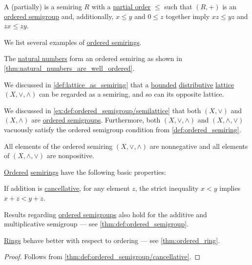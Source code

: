 \begin{definition}\label{def:ordered_semiring}
  A (partially)  is a semiring \( R \) with a \hyperref[def:partially_ordered_set]{partial order} \( \leq \) such that \( (R, +) \) is an \hyperref[def:ordered_semigroup]{ordered semigroup} and, additionally, \( x \leq y \) and \( 0 \leq z \) together imply \( xz \leq yz \) and \( zx \leq zy \).
\end{definition}

\begin{example}\label{ex:def:ordered_semiring}
  We list several examples of \hyperref[def:ordered_semiring]{ordered semirings}.

  \begin{thmenum}
     The \hyperref[def:natural_numbers]{natural numbers} form an ordered semiring as shown in \cref{thm:natural_numbers_are_well_ordered}.

     We discussed in \cref{def:lattice_as_semiring} that a \hyperref[def:extremal_points/bounds]{bounded} \hyperref[def:distributive_lattice]{distributive} \hyperref[def:lattice]{lattice} \( (X, \vee, \wedge) \) can be regarded as a semiring, and so can its opposite lattice.

    We discussed in \cref{ex:def:ordered_semigroup/semilattice} that both \( (X, \vee) \) and \( (X, \wedge) \) are \hyperref[def:ordered_semigroup]{ordered semigroups}. Furthermore, both \( (X, \vee, \wedge) \) and \( (X, \wedge, \vee) \) vacuously satisfy the ordered semigroup condition from \cref{def:ordered_semiring}.

    All elements of the ordered semiring \( (X, \vee, \wedge) \) are nonnegative and all elements of \( (X, \wedge, \vee) \) are nonpositive.
  \end{thmenum}
\end{example}

\begin{proposition}\label{thm:def:ordered_semiring}
  \hyperref[def:ordered_semiring]{Ordered} \hyperref[def:semiring]{semirings} have the following basic properties:
  \begin{thmenum}
     If addition is \hyperref[def:binary_operation/cancellative]{cancellative}, for any element \( z \), the strict inequality \( x < y \) implies \( x + z < y + z \).
  \end{thmenum}
\end{proposition}
\begin{comments}
  \item Results regarding \hyperref[def:ordered_semigroup]{ordered semigroups} also hold for the additive and multiplicative semigroup --- see \cref{thm:def:ordered_semigroup}.
  \item \hyperref[def:ring]{Rings} behave better with respect to ordering --- see \cref{thm:ordered_ring}.
\end{comments}
\begin{proof}
   Follows from \cref{thm:def:ordered_semigroup/cancellative}.
\end{proof}

